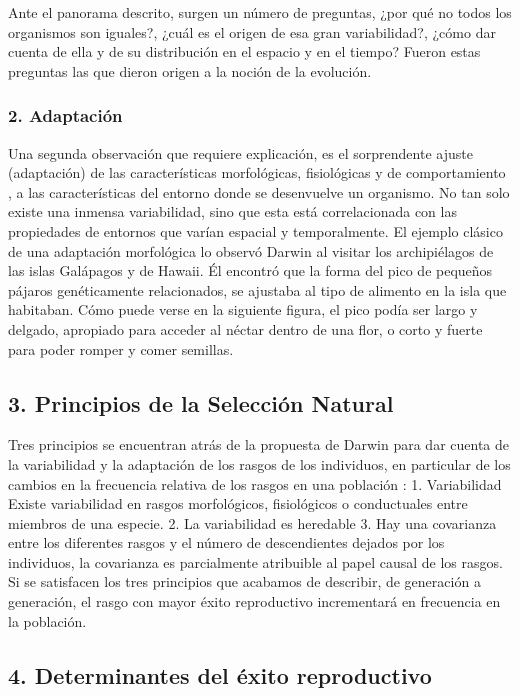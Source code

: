 \documentclass[
  letterpaper,
]{book}
\begin{document}
Ante el panorama descrito, surgen un número de preguntas, ¿por qué no
todos los organismos son iguales?, ¿cuál es el origen de esa gran
variabilidad?, ¿cómo dar cuenta de ella y de su distribución en el
espacio y en el tiempo? Fueron estas preguntas las que dieron origen a
la noción de la evolución.

\subsubsection{2. Adaptación}\label{adaptaciuxf3n}

Una segunda observación que requiere explicación, es el sorprendente
ajuste (adaptación) de las características morfológicas, fisiológicas y
de comportamiento , a las características del entorno donde se
desenvuelve un organismo. No tan solo existe una inmensa variabilidad,
sino que esta está correlacionada con las propiedades de entornos que
varían espacial y temporalmente. El ejemplo clásico de una adaptación
morfológica lo observó Darwin al visitar los archipiélagos de las islas
Galápagos y de Hawaii. Él encontró que la forma del pico de pequeños
pájaros genéticamente relacionados, se ajustaba al tipo de alimento en
la isla que habitaban. Cómo puede verse en la siguiente figura, el pico
podía ser largo y delgado, apropiado para acceder al néctar dentro de
una flor, o corto y fuerte para poder romper y comer semillas.

\subsection{3. Principios de la Selección
Natural}\label{principios-de-la-selecciuxf3n-natural-1}

Tres principios se encuentran atrás de la propuesta de Darwin para dar
cuenta de la variabilidad y la adaptación de los rasgos de los
individuos, en particular de los cambios en la frecuencia relativa de
los rasgos en una población : 1. Variabilidad Existe variabilidad en
rasgos morfológicos, fisiológicos o conductuales entre miembros de una
especie. 2. La variabilidad es heredable 3. Hay una covarianza entre los
diferentes rasgos y el número de descendientes dejados por los
individuos, la covarianza es parcialmente atribuible al papel causal de
los rasgos. Si se satisfacen los tres principios que acabamos de
describir, de generación a generación, el rasgo con mayor éxito
reproductivo incrementará en frecuencia en la población.

\subsection{4. Determinantes del éxito
reproductivo}\label{determinantes-del-uxe9xito-reproductivo}
\end{document}
